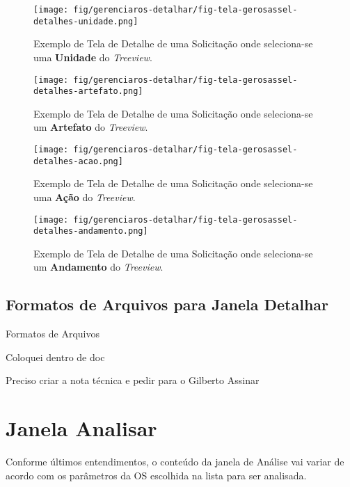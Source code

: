     \begin{figure}[htbp!]
		\centering
		\texttt{[image: fig/gerenciaros-detalhar/fig-tela-gerosassel-detalhes-unidade.png]}
		\caption{Exemplo de Tela de Detalhe de uma Solicitação onde seleciona-se uma \textbf{Unidade} do \emph{Treeview}.}
		\label{fig:detalhes:unidade}
	\end{figure}

	\begin{figure}[htbp!]
		\centering
		\texttt{[image: fig/gerenciaros-detalhar/fig-tela-gerosassel-detalhes-artefato.png]}
		\caption{Exemplo de Tela de Detalhe de uma Solicitação onde seleciona-se um \textbf{Artefato} do \emph{Treeview}.}
		\label{fig:detalhes:artefato}
	\end{figure}

	\begin{figure}[htbp!]
	\centering
	\texttt{[image: fig/gerenciaros-detalhar/fig-tela-gerosassel-detalhes-acao.png]}
	\caption{Exemplo de Tela de Detalhe de uma Solicitação onde seleciona-se uma \textbf{Ação} do \emph{Treeview}.}
	\label{fig:detalhes:acao}
	\end{figure}

	\begin{figure}[htbp!]
	\centering
	\texttt{[image: fig/gerenciaros-detalhar/fig-tela-gerosassel-detalhes-andamento.png]}
	\caption{Exemplo de Tela de Detalhe de uma Solicitação onde seleciona-se um \textbf{Andamento} do \emph{Treeview}.}
	\label{fig:detalhes:andamento}
	\end{figure}


	\subsection{Formatos de Arquivos para Janela Detalhar}	
	
	
	Formatos de Arquivos
	
	Coloquei dentro de doc
	
	Preciso criar a nota técnica e pedir para o Gilberto Assinar
	
	 
	





\section{Janela Analisar}

Conforme últimos entendimentos, o conteúdo da janela de Análise vai variar de acordo com os parâmetros da OS escolhida na lista para ser analisada.


